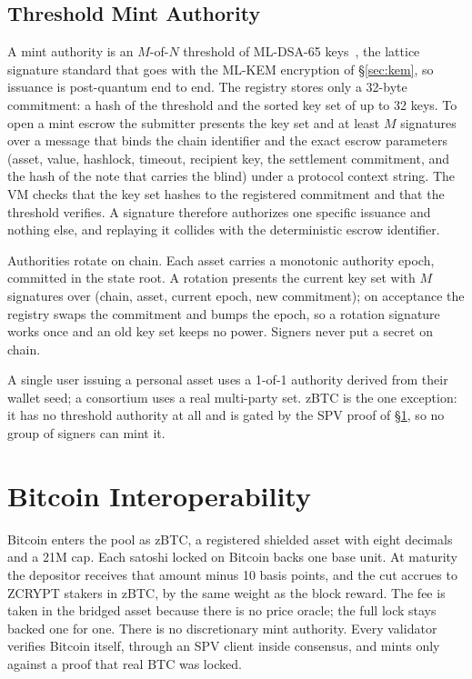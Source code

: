 \documentclass[twocolumn,10pt]{article}
\begin{document}
\subsection{Threshold Mint Authority}
\label{sec:mintauth}

A mint authority is an $M$-of-$N$ threshold of ML-DSA-65 keys~\cite{fips204}, the lattice signature standard that goes with the ML-KEM encryption of \S\ref{sec:kem}, so issuance is post-quantum end to end. The registry stores only a 32-byte commitment: a hash of the threshold and the sorted key set of up to 32 keys. To open a mint escrow the submitter presents the key set and at least $M$ signatures over a message that binds the chain identifier and the exact escrow parameters (asset, value, hashlock, timeout, recipient key, the settlement commitment, and the hash of the note that carries the blind) under a protocol context string. The VM checks that the key set hashes to the registered commitment and that the threshold verifies. A signature therefore authorizes one specific issuance and nothing else, and replaying it collides with the deterministic escrow identifier.

Authorities rotate on chain. Each asset carries a monotonic authority epoch, committed in the state root. A rotation presents the current key set with $M$ signatures over (chain, asset, current epoch, new commitment); on acceptance the registry swaps the commitment and bumps the epoch, so a rotation signature works once and an old key set keeps no power. Signers never put a secret on chain.

A single user issuing a personal asset uses a 1-of-1 authority derived from their wallet seed; a consortium uses a real multi-party set. zBTC is the one exception: it has no threshold authority at all and is gated by the SPV proof of \S\ref{sec:bridge}, so no group of signers can mint it.

\section{Bitcoin Interoperability}
\label{sec:bridge}

Bitcoin enters the pool as zBTC, a registered shielded asset with eight decimals and a 21M cap. Each satoshi locked on Bitcoin backs one base unit. At maturity the depositor receives that amount minus 10 basis points, and the cut accrues to ZCRYPT stakers in zBTC, by the same weight as the block reward. The fee is taken in the bridged asset because there is no price oracle; the full lock stays backed one for one. There is no discretionary mint authority. Every validator verifies Bitcoin itself, through an SPV client inside consensus, and mints only against a proof that real BTC was locked.
\end{document}

